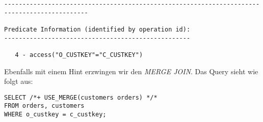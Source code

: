 \documentclass[11pt,a4paper,parskip=half]{scrartcl}
\begin{document}
\begin{lstlisting}
---------------------------------------------------------------------------------------------                                                                                                                                                                                                                
                                                                                                                                                                                                                                                                                                             
Predicate Information (identified by operation id):                                                                                                                                                                                                                                                          
---------------------------------------------------                                                                                                                                                                                                                                                          
                                                                                                                                                                                                                                                                                                             
   4 - access("O_CUSTKEY"="C_CUSTKEY")                                                                                                                                                                                                                                                                       
\end{lstlisting}

Ebenfalls mit einem Hint erzwingen wir den \emph{MERGE JOIN}. Das Query sieht wie folgt aus:
\begin{lstlisting}
SELECT /*+ USE_MERGE(customers orders) */*
FROM orders, customers
WHERE o_custkey = c_custkey;
\end{lstlisting}
\end{document}
